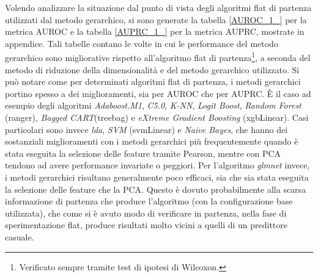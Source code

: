 \documentclass[12pt]{report}
\begin{document}
\begin{table}[h!]
{\begin{subtable}[t]{0.4\textwidth}
                    \label{table1}
                    \end{subtable}}\par\bigskip
\caption{\footnotesize{Confronto tra i diversi metodi di correzione gerarchica e i metodi flat, per la metrica PRC, date le diverse ontologie (BP, MF, CC) e i due metodi di riduzione della dimensionalità usati (FS, PCA). Le tabelle contano le volte in cui, fissato un algoritmo di ML, un metodo ensemble (riga) supera un altro metodo (colonna) a livello di performance (win), risulta equivalente (tie) o performa peggio (loss). Un metodo viene considerato migliorativo rispetto al metodo flat, se il test di Wilcoxon rifiuta l'ipotesi nulla (p-value $<$ 0.01 con correzione di Bonferroni) e se la media della performance per classe è maggiore. Da tali tabelle si desume che in generale in metodi ensemble gerarchici migliorano significativamente le performance rispetto ai metodi flat. Tale differenza è più marcata quando si usa la selezione delle feature con correlazione di Pearson. I metodi TPR e ISO-TPR ottengono i risultati migliori.}}
\label{test_ipotesi2}
\end{table}
\newpage
Volendo analizzare la situazione dal punto di vista degli algoritmi flat di partenza utilizzati dal metodo gerarchico, si sono generate la tabella \ref{AUROC_1_} per la metrica AUROC e la tabella \ref{AUPRC_1_} per la metrica AUPRC, mostrate in appendice. Tali tabelle contano le volte in cui le performance del metodo gerarchico sono migliorative rispetto all'algoritmo flat di partenza\footnote{\footnotesize{Verificato sempre tramite test di ipotesi di Wilcoxon.}}, a seconda del metodo di riduzione della dimensionalità e del metodo gerarchico utilizzato. Si può notare come per determinati algoritmi flat di partenza, i metodi gerarchici portino spesso a dei miglioramenti, sia per AUROC che per AUPRC. È il caso ad esempio degli algoritmi \emph{Adaboost.M1}, \emph{C5.0}, \emph{K-NN}, \emph{Logit Boost}, \emph{Random Forest} (ranger), \emph{Bagged CART}(treebag) e \emph{eXtreme Gradient Boosting} (xgbLinear). Casi particolari sono invece \emph{lda}, \emph{SVM} (svmLinear) e \emph{Naive Bayes}, che hanno dei sostanziali miglioramenti con i metodi gerarchici più frequentemente quando è stata eseguita la selezione delle feature tramite Pearson, mentre con PCA tendono ad avere performance invariate o peggiori. Per l'algoritmo \emph{glmnet} invece, i metodi gerarchici risultano generalmente poco efficaci, sia che sia stata eseguita la selezione delle feature che la PCA. Questo è dovuto probabilmente alla scarsa informazione di partenza che produce l'algoritmo (con la configurazione base utilizzata), che come si è avuto modo di verificare in partenza, nella fase di sperimentazione flat, produce risultati molto vicini a quelli di un predittore casuale.
\end{document}
